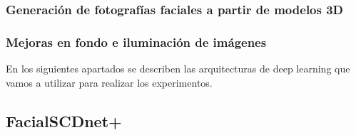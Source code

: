\subsubsection{Generación de fotografías faciales a partir de modelos 3D}

\subsubsection{Mejoras en fondo e iluminación de imágenes}

En los siguientes apartados se describen las arquitecturas de deep learning que vamos a utilizar para realizar los experimentos.

\subsection{FacialSCDnet+}

